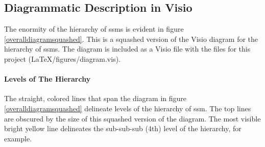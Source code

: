 \documentclass[../../main/main.tex]{subfiles}
\begin{document}
\subsection{Diagrammatic Description in Visio}\label{ssec:overalldiagram}
The enormity of the hierarchy of \gls{ssm}s is evident in figure \ref{overalldiagramsquashed}.  This is a squashed version of the Visio diagram for the hierarchy of \gls{ssm}s. The diagram is included as a Visio file with the files for this project (LaTeX/figures/diagram.vis).  

\paragraph*{Levels of The Hierarchy}

The straight, colored lines that span the diagram in figure \ref{overalldiagramsquashed} delineate levels of the hierarchy of \gls{ssm}.  The top lines are obscured by the size of this squashed version of the diagram.  The most visible bright yellow line delineates the sub-sub-sub (4th) level of the hierarchy, for example.
\end{document}
